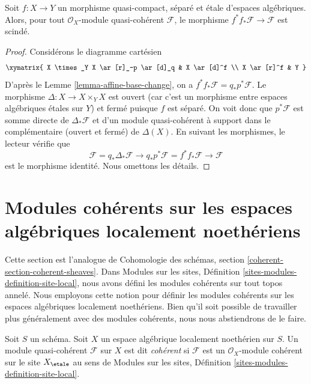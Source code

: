 \begin{lemma}
\label{lemma-etale-pull-push-split}
Soit $f : X \to Y$ un morphisme quasi-compact, séparé et \'etale
d'espaces algébriques. Alors, pour tout $\mathcal{O}_X$-module quasi-cohérent
$\mathcal{F}$, le morphisme $f^*f_*\mathcal{F} \to \mathcal{F}$ est scindé.
\end{lemma}

\begin{proof}
Considérons le diagramme cartésien
$$
\xymatrix{
X \times_Y X \ar[r]_-p \ar[d]_q & X \ar[d]^f \\
X \ar[r]^f & Y
}
$$
D'après le Lemme \ref{lemma-affine-base-change}, on a
$f^*f_*\mathcal{F} = q_*p^*\mathcal{F}$. Le morphisme
$\Delta : X \to X \times_Y X$ est ouvert (car c'est un morphisme entre
espaces algébriques \'etales sur $Y$) et fermé puisque $f$ est séparé.
On voit donc que $p^*\mathcal{F}$ est somme directe de
$\Delta_*\mathcal{F}$ et d'un module quasi-cohérent à support
dans le complémentaire (ouvert et fermé) de $\Delta(X)$.
En suivant les morphismes, le lecteur vérifie que
$$
\mathcal{F} = q_*\Delta_*\mathcal{F} \to
q_*p^*\mathcal{F} = f^*f_*\mathcal{F} \to
\mathcal{F}
$$
est le morphisme identité. Nous omettons les détails.
\end{proof}



\section{Modules cohérents sur les espaces algébriques localement noethériens}
\label{section-coherent}

\noindent
Cette section est l'analogue de
Cohomologie des schémas, section \ref{coherent-section-coherent-sheaves}.
Dans Modules sur les sites, Définition \ref{sites-modules-definition-site-local},
nous avons défini les modules cohérents sur tout topos annelé. Nous employons cette notion
pour définir les modules cohérents sur les espaces algébriques localement noethériens.
Bien qu'il soit possible de travailler plus généralement avec des modules cohérents,
nous nous abstiendrons de le faire.

\begin{definition}
\label{definition-coherent}
Soit $S$ un schéma. Soit $X$ un espace algébrique localement noethérien sur $S$.
Un module quasi-cohérent $\mathcal{F}$ sur $X$ est dit {\it cohérent}
si $\mathcal{F}$ est un $\mathcal{O}_X$-module cohérent sur le site
$X_\etale$ au sens de
Modules sur les sites, Définition \ref{sites-modules-definition-site-local}.
\end{definition}


